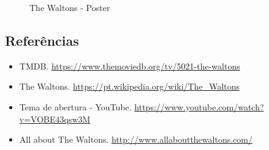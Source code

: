 \begin{figure}
  \centering
    \caption{The Waltons - Poster\label{fig:the-waltons-poster}}
\end{figure}

\hypertarget{referuxeancias-4}{%
\subsection{Referências}\label{referuxeancias-4}}

\begin{itemize}
\tightlist
\item
  \sloppy TMDB. \url{https://www.themoviedb.org/tv/5021-the-waltons}
\item
  \sloppy The Waltons. \url{https://pt.wikipedia.org/wiki/The_Waltons}
\item
  \sloppy Tema de abertura - YouTube. \url{https://www.youtube.com/watch?v=VOBE43qsw3M}
\item
  \sloppy All about The Waltons. \url{http://www.allaboutthewaltons.com/}
\end{itemize}
